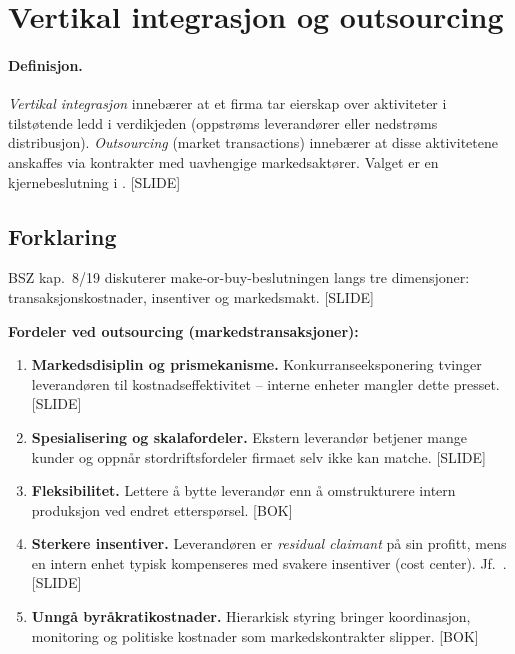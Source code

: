 \section{Vertikal integrasjon og outsourcing}\label{thr:vertical-integration-outsourcing}

\paragraph{Definisjon.} \emph{Vertikal integrasjon} innebærer at et firma tar eierskap over aktiviteter i tilstøtende ledd i verdikjeden (oppstrøms leverandører eller nedstrøms distribusjon). \emph{Outsourcing} (market transactions) innebærer at disse aktivitetene anskaffes via kontrakter med uavhengige markedsaktører. Valget er en kjernebeslutning i . [SLIDE]

\subsection*{Forklaring}

BSZ kap.\ 8/19 diskuterer make-or-buy-beslutningen langs tre dimensjoner: transaksjonskostnader, insentiver og markedsmakt. [SLIDE]

\textbf{Fordeler ved outsourcing (markedstransaksjoner):}
\begin{enumerate}\setlength{\itemsep}{2pt}
\item \textbf{Markedsdisiplin og prismekanisme.} Konkurranseeksponering tvinger leverandøren til kostnadseffektivitet -- interne enheter mangler dette presset. [SLIDE]
\item \textbf{Spesialisering og skalafordeler.} Ekstern leverandør betjener mange kunder og oppnår stordriftsfordeler firmaet selv ikke kan matche. [SLIDE]
\item \textbf{Fleksibilitet.} Lettere å bytte leverandør enn å omstrukturere intern produksjon ved endret etterspørsel. [BOK]
\item \textbf{Sterkere insentiver.} Leverandøren er \emph{residual claimant} på sin profitt, mens en intern enhet typisk kompenseres med svakere insentiver (cost center). Jf.\ . [SLIDE]
\item \textbf{Unngå byråkratikostnader.} Hierarkisk styring bringer koordinasjon, monitoring og politiske kostnader som markedskontrakter slipper. [BOK]
\end{enumerate}

